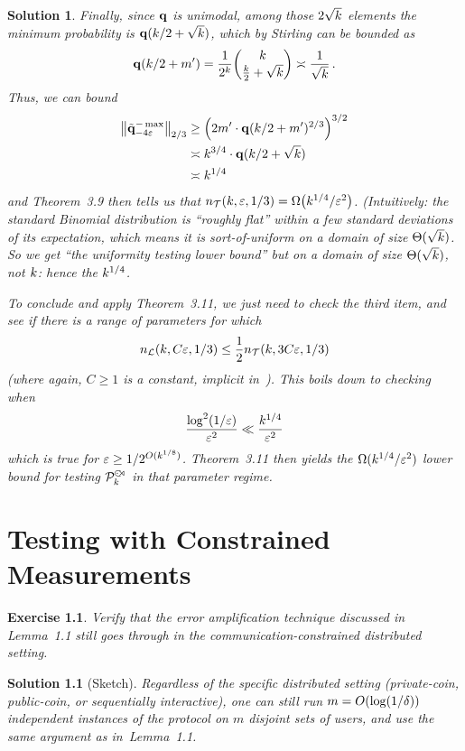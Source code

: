 \documentclass[biber]{nowfnt} %
\newtheorem{question}{Exercise}[chapter]
\newtheorem{solution}{Solution}[chapter]
\begin{document}
\begin{solution}
Finally, since $\mathbf{q}$ is unimodal, among those $2\sqrt{k}$ elements the minimum probability is $\mathbf{q}(k/2+\sqrt{k})$, which by Stirling can be bounded as
\[
	\mathbf{q}(k/2+m') = \frac{1}{2^k} \binom{k}{\frac{k}{2}+\sqrt{k}} \asymp \frac{1}{\sqrt{k}}  \,.
\]
Thus, we can bound
\begin{align*}
	\norm{\tilde{\q}^{-\max}_{-4\dst}}_{2/3} 
	&\geq \Paren{ 2m'\cdot \q(\ab/2+m')^{2/3} }^{3/2}  \\
	&\asymp \ab^{3/4} \cdot \q(\ab/2+\sqrt{\ab})  \\
	&\asymp \ab^{1/4}
\end{align*}
and Theorem~3.9 then tells us that $\ns_{\mathcal{T}}(\ab,\dst,1/3) = \bigOmega{\ab^{1/4}/\dst^2}$. \emph{(Intuitively: the standard Binomial distribution is ``roughly flat'' within a few standard deviations of its expectation, which means it is sort-of-uniform on a domain of size $\Theta(\sqrt{k})$. So we get ``the uniformity testing lower bound'' but on a domain of size $\Theta(\sqrt{k})$, not $k$: hence the $k^{1/4}$.}

To conclude and apply Theorem~3.11, we just need to check the third item, and see if there is a range of parameters for which
\[
		n_{\mathcal{L}}(k,C\varepsilon,1/3)  \leq \frac{1}{2}n_{\mathcal{T}}(k,3C\varepsilon,1/3) 
\]
(where again, $C\geq 1$ is a constant, implicit in~\citep{DDS:PBD:15}). This boils down to checking when
\[
		\frac{\log^2(1/\varepsilon)}{\varepsilon^2} \ll \frac{k^{1/4}}{\varepsilon^2}
\]
which is true for $\varepsilon \geq 1/2^{O(k^{1/8})}$.  Theorem~3.11 then yields the $\Omega(k^{1/4}/\varepsilon^2)$ lower bound for testing $\mathcal{P}^{\hspace{1pt}{\cdot}\kern -4pt {\subset}\kern -3pt {\rtimes}}_{k}$ in that parameter regime. 
\end{solution}

\chapter{Testing with Constrained Measurements}
  \label{chap:constrained}
  
  \begin{question}\label{exo:error:amplification}
Verify that the error amplification technique discussed in Lemma~1.1 still goes through in the communication-constrained distributed setting.
\end{question}
\begin{solution}[Sketch]
Regardless of the specific distributed setting (private-coin, public-coin, or sequentially interactive), one can still run $m=\bigO{\log(1/\errprob)}$ independent instances of the protocol on $m$ disjoint sets of users, and use the same argument as in~Lemma~1.1.
\end{solution}
\end{document}
